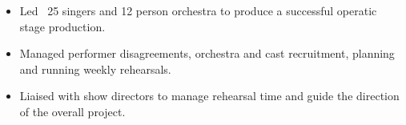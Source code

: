 {
  {\begin{itemize}
    \item Led ~25 singers and 12 person orchestra to produce a successful operatic stage production.
    \item Managed performer disagreements, orchestra and cast recruitment, planning and running weekly rehearsals.  
    \item Liaised with show directors to manage rehearsal time and guide the direction of the overall project.
  \end{itemize}
  }
}


